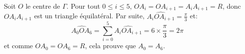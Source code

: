 Soit $O$ le centre de $\Gamma$. Pour tout $0\leq i \leq 5$, $OA_i=OA_{i+1}=A_iA_{i+1}=R$, donc $OA_iA_{i+1}$ est un triangle équilatéral. Par suite, $\widehat{A_iOA_{i+1}}=\frac{\pi}{3}$ et:
\[
\widehat{A_0OA_6} = \sum_{i=0}^5{\widehat{A_iOA_{i+1}}} = 6\times \frac{\pi}{3} = 2\pi
\]
et comme $OA_0=OA_6=R$, cela prouve que $A_0=A_6$. 
